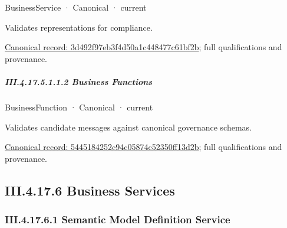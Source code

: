 \label{navigation:III.4.17.5.1.1.1.1}

\label{element:3d492f97eb3f4d50a1c448477c61bf2b}
{\small BusinessService · Canonical · current}\par

Validates representations for compliance.


{\footnotesize \href{../../../../continuum/business/business-service/3d492f97eb3f4d50a1c448477c61bf2b.md}{Canonical record: 3d492f97eb3f4d50a1c448477c61bf2b}; full qualifications and provenance.}\par
\subparagraph*{III.4.17.5.1.1.2 Business Functions}
\label{navigation:III.4.17.5.1.1.2}

\label{navigation:III.4.17.5.1.1.2.1}

\label{element:5445184252c94c05874c52350ff13d2b}
{\small BusinessFunction · Canonical · current}\par

Validates candidate messages against canonical governance schemas.


{\footnotesize \href{../../../../continuum/business/business-function/5445184252c94c05874c52350ff13d2b.md}{Canonical record: 5445184252c94c05874c52350ff13d2b}; full qualifications and provenance.}\par
\subsection*{III.4.17.6 Business Services}
\label{navigation:III.4.17.6}

\subsubsection*{III.4.17.6.1 Semantic Model Definition Service}
\label{navigation:III.4.17.6.1}

